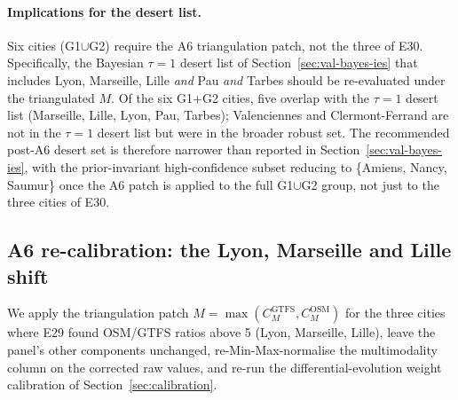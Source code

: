 \documentclass[11pt,a4paper]{article}
\begin{document}
\paragraph{Implications for the desert list.}
Six cities (G1$\cup$G2) require the A6 triangulation patch, not
the three of E30. Specifically, the Bayesian $\tau = 1$ desert
list of Section~\ref{sec:val-bayes-ies} that includes Lyon,
Marseille, Lille \emph{and} Pau \emph{and} Tarbes should be
re-evaluated under the triangulated $M$. Of the six G1+G2 cities,
five overlap with the $\tau = 1$ desert list (Marseille, Lille,
Lyon\footnotemark[1], Pau, Tarbes); Valenciennes and
Clermont-Ferrand are not in the $\tau = 1$ desert list but were
in the broader robust set. The recommended post-A6 desert set is
therefore narrower than reported in
Section~\ref{sec:val-bayes-ies}, with the prior-invariant
high-confidence subset reducing to \{Amiens, Nancy, Saumur\}
once the A6 patch is applied to the full G1$\cup$G2 group, not
just to the three cities of E30.


\subsection{A6 re-calibration: the Lyon, Marseille and Lille shift}
\label{sec:val-a6-rerun}

We apply the triangulation patch $M = \max(C_M^{\text{GTFS}},
C_M^{\text{OSM}})$ for the three cities where E29 found
OSM/GTFS ratios above 5 (Lyon, Marseille, Lille), leave the
panel's other components unchanged, re-Min-Max-normalise the
multimodality column on the corrected raw values, and re-run the
differential-evolution weight calibration of
Section~\ref{sec:calibration}.
\end{document}
